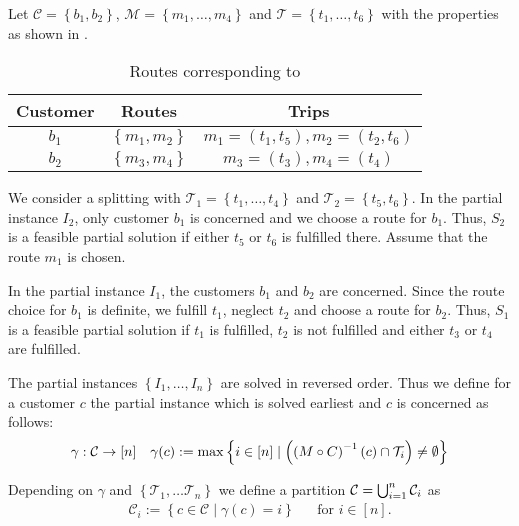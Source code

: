 \begin{example}
\label{ex:routechoice}

Let ${\mathcal{C}=\left\{b_1,b_2\right\}}$, ${\mathcal{M}=\left\{m_1,\dots,m_4\right\}}$ and ${\mathcal{T}=\left\{t_1,\dots,t_6\right\}}$ with the properties as shown in .

\begin{table}[htb]
	\centering
	\begin{tabular}{c|cc}
		Customer & Routes & Trips \\
		\hline
		$b_1$ & $\left\{m_1,m_2\right\}$ & $m_1=\left(t_1,t_5\right), m_2=\left(t_2,t_6\right)$ \\
		$b_2$ & $\left\{m_3,m_4\right\}$ & $m_3=\left(t_3\right), m_4=\left(t_4\right)$
	\end{tabular}
	\caption{Routes corresponding to }
	\label{tab:routechoice}
\end{table}

We consider a splitting with ${\mathcal{T}_1=\left\{t_1,\dots,t_4\right\}}$ and ${\mathcal{T}_2=\left\{t_5,t_6\right\}}$. In the partial instance $I_2$, only customer $b_1$ is concerned and we choose a route for $b_1$. Thus, $S_2$ is a feasible partial solution if either $t_5$ or $t_6$ is fulfilled there. Assume that the route $m_1$ is chosen. 

In the partial instance $I_1$, the customers $b_1$ and $b_2$ are concerned. Since the route choice for $b_1$ is definite, we fulfill $t_1$, neglect $t_2$ and choose a route for $b_2$. Thus, $S_1$ is a feasible partial solution if $t_1$ is fulfilled, $t_2$ is not fulfilled and either $t_3$ or $t_4$ are fulfilled.

\end{example}

The partial instances $\left\{I_1,\dots,I_n\right\}$ are solved in reversed order. Thus we define for a customer $c$ the partial instance which is solved earliest and $c$ is concerned as follows:
\begin{align*}
	\gamma: \mathcal{C}\to[n] && \gamma(c) := \max\left\{i\in[n]\mid\left(\left(M\circ C\right)^{-1}(c)\cap\mathcal{T}_i\right)\neq\emptyset\right\}
\end{align*}

Depending on $\gamma$ and $\left\{\mathcal{T}_1,\dots\mathcal{T}_n\right\}$ we define a partition ${\mathcal{C}=\bigcup_{i=1}^n \mathcal{C}_i}$ as
\begin{align*}
	\mathcal{C}_i := \left\{c\in\mathcal{C}\mid \gamma(c)=i\right\} && \text{for } i\in[n].
\end{align*}

